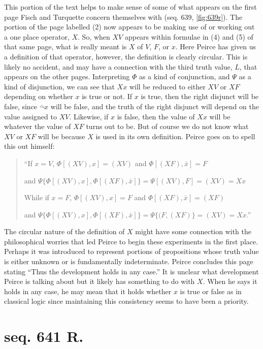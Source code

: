 \noindent This portion of the text helps to make sense of some of what appears on the first page Fisch and Turquette concern themselves with (seq. 639, \ref{fig:639r}). The portion of the page labelled (2) now appears to be making use of or working out a one place operator, $X$. So, when $XV$ appears within formulae in (4) and (5) of that same page, what is really meant is $X$ of $V$, $F$, or $x$. Here Peirce has given us a definition of that operator, however, the definition is clearly circular. This is likely no accident, and may have a connection with the third truth value, $L$, that appears on the other pages. Interpreting $\Phi$ as a kind of conjunction, and $\Psi$ as a kind of disjunction, we can see that $Xx$ will be reduced to either $XV$ or $XF$ depending on whether $x$ is true or not. If $x$ is true, then the right disjunct will be false, since $\bar{\lnot}x$ will be false, and the truth of the right disjunct will depend on the value assigned to $XV$. Likewise, if $x$ is false, then the value of $Xx$ will be whatever the value of $XF$ turns out to be. But of course we do not know what $XV$ or $XF$ will be because $X$ is used in its own definition. Peirce goes on to spell this out himself:
\begin{quotation}
``If $x=V$, $\Phi[(XV), x]=(XV)$ and $\Phi[(XF), \bar{x}]=F$

and $\Psi\{\Phi[(XV), x],\Phi[(XF), \bar{x}]\}=\Psi[(XV), F]= (XV)=Xx$

While if $x=F$, $\Phi[(XV), x]=F$ and $\Phi[(XF), \bar{x}]=(XF)$

and $\Psi\{\Phi[(XV), x],\Phi[(XF), \bar{x}]\}=\Psi\{(F, (XF)\}= (XV)=Xx$.''
\end{quotation}
The circular nature of the definition of $X$ might have some connection with the philosophical worries that led Peirce to begin these experiments in the first place. Perhaps it was introduced to represent portions of propositions whose truth value is either unknown or is fundamentally indeterminate. Peirce concludes this page stating ``Thus the development holds in any case.'' It is unclear what development Peirce is talking about but it likely has something to do with $X$. When he says it holds in any case, he may mean that it holds whether $x$ is true or false as in classical logic since maintaining this consistency seems to have been a priority.

\section{seq. 641 R.}

